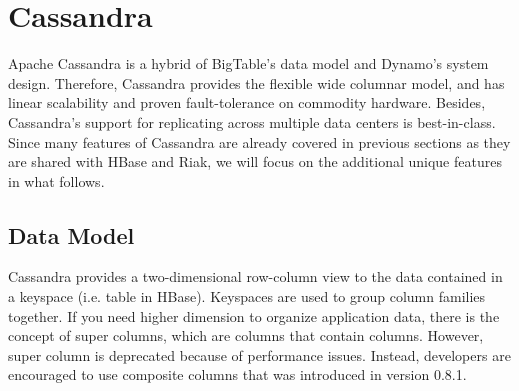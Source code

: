 \documentclass[11pt]{book}
\begin{document}
\section[Cassandra]
{Cassandra}
Apache Cassandra \cite{Lakshman:2010:CDS, Cassandra} is a hybrid of BigTable's data model and Dynamo's system design. Therefore, Cassandra provides the flexible wide columnar model, and has linear scalability and proven fault-tolerance on commodity hardware. Besides, Cassandra's support for replicating across multiple data centers is best-in-class. Since many features of Cassandra are already covered in previous sections as they are shared with HBase and Riak, we will focus on the additional unique features in what follows.

\subsection{Data Model}

Cassandra provides a two-dimensional row-column view to the data contained in a keyspace (i.e. table in HBase). Keyspaces are used to group column families together. If you need higher dimension to organize application data, there is the concept of super columns, which are columns that contain columns. However, super column is deprecated because of performance issues. Instead, developers are encouraged to use composite columns that was introduced in version 0.8.1. 
\end{document}
